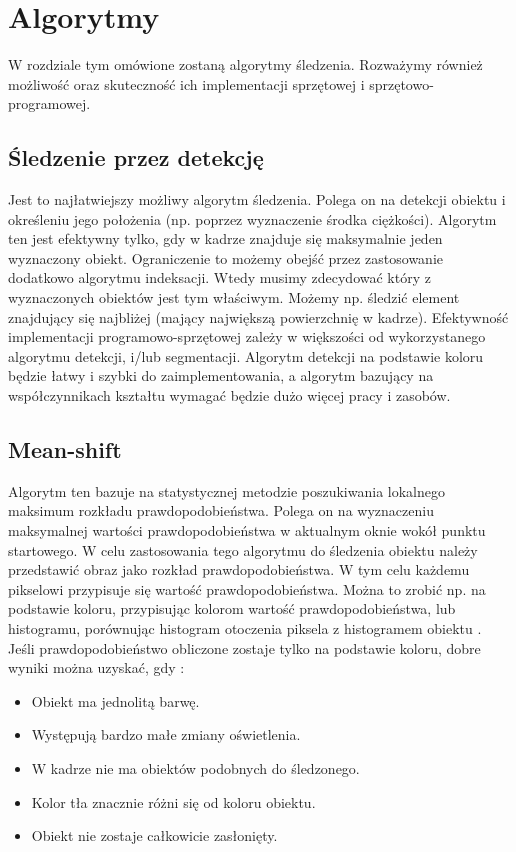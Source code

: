 \chapter{Algorytmy}
\label{cha:algorytmy}

W rozdziale tym omówione zostaną algorytmy śledzenia. Rozważymy również możliwość oraz skuteczność ich implementacji sprzętowej i sprzętowo-programowej.

\section{Śledzenie przez detekcję}
\label{sec:sledzenieprzezdetekcje}

Jest to najłatwiejszy możliwy algorytm śledzenia. Polega on na detekcji obiektu i określeniu jego położenia (np. poprzez wyznaczenie środka ciężkości). Algorytm ten jest efektywny tylko, gdy w kadrze znajduje się maksymalnie jeden wyznaczony obiekt. Ograniczenie to możemy obejść przez zastosowanie dodatkowo algorytmu indeksacji. Wtedy musimy zdecydować który z wyznaczonych obiektów jest tym właściwym. Możemy np. śledzić element znajdujący się najbliżej (mający największą powierzchnię w kadrze). Efektywność implementacji programowo-sprzętowej zależy w większości od wykorzystanego algorytmu detekcji, i/lub segmentacji. Algorytm detekcji na podstawie koloru będzie łatwy i szybki do zaimplementowania, a algorytm bazujący na współczynnikach kształtu  wymagać będzie dużo więcej pracy i zasobów.

\section{Mean-shift}
\label{sec:meanshift}

Algorytm ten bazuje na statystycznej metodzie poszukiwania lokalnego maksimum rozkładu prawdopodobieństwa. Polega on na wyznaczeniu maksymalnej wartości prawdopodobieństwa w aktualnym oknie wokół punktu startowego. W celu zastosowania tego algorytmu do śledzenia obiektu należy przedstawić obraz jako rozkład prawdopodobieństwa. W tym celu każdemu pikselowi przypisuje się wartość prawdopodobieństwa. Można to zrobić np. na podstawie koloru, przypisując kolorom wartość prawdopodobieństwa, lub histogramu, porównując histogram otoczenia piksela z histogramem obiektu \cite{CMS}. Jeśli prawdopodobieństwo obliczone zostaje tylko na podstawie koloru, dobre wyniki można uzyskać, gdy \cite{CMS}:
\begin{itemize}
\item Obiekt ma jednolitą barwę.
\item Występują bardzo małe zmiany oświetlenia.
\item W kadrze nie ma obiektów podobnych do śledzonego.
\item Kolor tła znacznie różni się od koloru obiektu.
\item Obiekt nie zostaje całkowicie zasłonięty.
\end{itemize}
